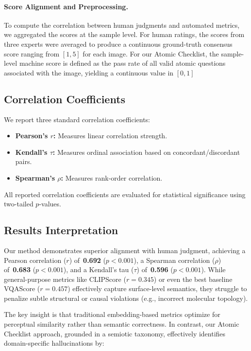 \documentclass[runningheads]{llncs}
\begin{document}
\paragraph{Score Alignment and Preprocessing.} 
To compute the correlation between human judgments and automated metrics, we aggregated the scores at the sample level. For human ratings, the scores from three experts were averaged to produce a continuous ground-truth consensus score ranging from $[1, 5]$ for each image. For our Atomic Checklist, the sample-level machine score is defined as the pass rate of all valid atomic questions associated with the image, yielding a continuous value in $[0, 1]$ 

\subsection{Correlation Coefficients}

We report three standard correlation coefficients:

\begin{itemize}
    \item \textbf{Pearson's $r$:} Measures linear correlation strength.
    \item \textbf{Kendall's $\tau$:} Measures ordinal association based on concordant/discordant pairs.
    \item \textbf{Spearman's $\rho$:} Measures rank-order correlation.
\end{itemize}
All reported correlation coefficients are evaluated for statistical significance using two-tailed $p$-values.

\subsection{Results Interpretation}

Our method demonstrates superior alignment with human judgment, achieving a Pearson correlation ($r$) of~\textbf{0.692} ($p < 0.001$), a Spearman correlation ($\rho$) of~\textbf{0.683} ($p < 0.001$), and a Kendall's tau ($\tau$) of~\textbf{0.596} ($p < 0.001$). While general-purpose metrics like CLIPScore ($r=0.345$) or even the best baseline VQAScore ($r=0.457$) effectively capture surface-level semantics, they struggle to penalize subtle structural or causal violations (e.g., incorrect molecular topology). 

The key insight is that traditional embedding-based metrics optimize for perceptual similarity rather than semantic correctness. In contrast, our Atomic Checklist approach, grounded in a semiotic taxonomy, effectively identifies domain-specific hallucinations by:
\end{document}

